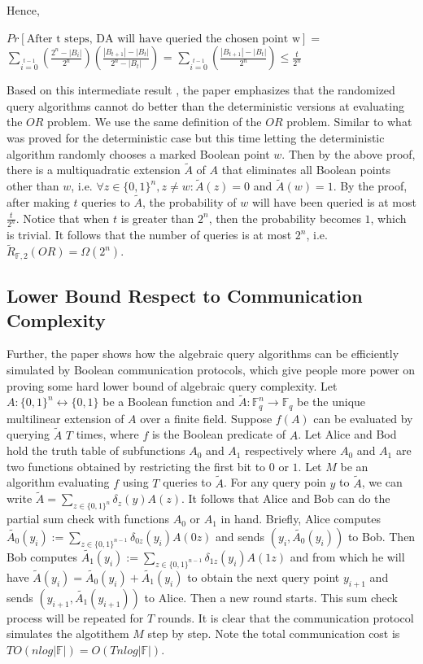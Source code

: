 \documentclass{article}
\begin{document}
 
  Hence,
  
  \begin{center}
       $Pr[\text{After t steps, DA will have queried the chosen point w}] = $ $ \sum\limits_{i=0}\limits^{t-1} (\frac{2^n - |B_i|}{2^n})(\frac{|B_{t+1}| - |B_t|}{2^n - |B_t|}) $ = $\sum\limits_{i=0}\limits^{t-1} (\frac{|B_{t+1}| - |B_t|}{2^n}) \le \frac{t}{2^n}$
  \end{center}
  
  Based on this intermediate result , the paper emphasizes that the randomized query algorithms cannot do better than the deterministic versions at evaluating the $OR$ problem. We use the same definition of the $OR$ problem. Similar to what was proved for the deterministic case but this time letting the deterministic algorithm randomly chooses a marked Boolean point $w$. Then by the above proof, there is a multiquadratic extension $\tilde{A}$ of $A$ that eliminates all Boolean points other than $w$, i.e. $\forall z \in \{0,1\}^n, z \neq w : \tilde{A}(z)=0$ and $\tilde{A}(w)=1$. By the proof, after making $t$ queries to $\tilde{A}$, the probability of $w$ will have been queried is at most $\frac{t}{2^n}$. Notice that when $t$ is greater than $2^n$, then the probability becomes $1$, which is trivial. It follows that the number of queries is at most $2^n$, i.e. $\tilde{R}_{\mathbb{F},2}(OR) = \Omega(2^n)$.
  

  \subsection{Lower Bound Respect to Communication Complexity}
  
  Further, the paper shows how the algebraic query algorithms can be efficiently simulated by Boolean communication protocols, which give people more power on proving some hard lower bound of algebraic query complexity. Let $A: \{0,1\}^n \leftrightarrow \{0,1\}$ be a Boolean function and $\tilde{A}: \mathbb{F}^n_q \rightarrow \mathbb{F}_q$ be the unique multilinear extension of $A$ over a finite field. Suppose $f(A)$ can be evaluated by querying $\tilde{A}$ $T$ times, where $f$ is the Boolean predicate of $A$. Let Alice and Bod hold the truth table of subfunctions $A_0$ and $A_1$ respectively where $A_0$ and $A_1$ are two functions obtained by restricting the first bit to $0$ or $1$. Let $M$ be an algorithm evaluating $f$ using $T$ queries to $\tilde{A}$. For any query poin $y$ to $\tilde{A}$, we can write $\tilde{A} = \sum\limits_{z\in\{0,1\}^n} \delta_z(y)A(z)$. It follows that Alice and Bob can do the partial sum check with functions $A_0$ or $A_1$ in hand. Briefly, Alice computes $\tilde{A_0}(y_i) := \sum\limits_{z\in\{0,1\}^{n-1}} \delta_{0z}(y_i)A(0z) $ and sends $(y_i,\tilde{A_0}(y_i))$ to Bob. Then Bob computes $\tilde{A_1}(y_i) := \sum\limits_{z\in\{0,1\}^{n-1}} \delta_{1z}(y_i)A(1z) $ and from which he will have $\tilde{A}(y_{i}) = \tilde{A_0}(y_{i}) + \tilde{A_1}(y_{i})$ to obtain the next query point $y_{i+1}$ and sends $(y_{i+1},\tilde{A_1}(y_{i+1}))$ to Alice. Then a new round starts. This sum check process will be repeated for $T$ rounds. It is clear that the communication protocol simulates the algotithem $M$ step by step. Note the total communication cost is $TO(nlog|\mathbb{F}|) = O(Tnlog|\mathbb{F}|)$. 
  
\end{document}
